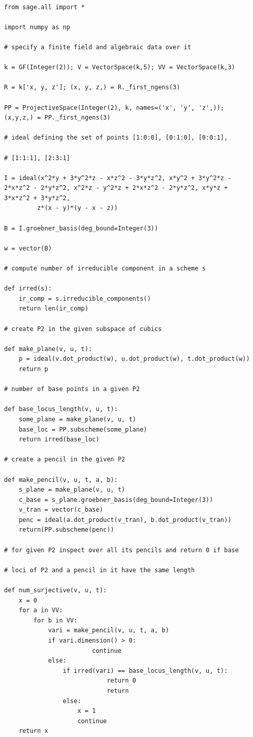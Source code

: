 \documentclass[14pt]{amsart}
\theoremstyle{definition}
\theoremstyle{remark}
\begin{document}
{\small
\begin{lstlisting}

from sage.all import *

import numpy as np

# specify a finite field and algebraic data over it

k = GF(Integer(2)); V = VectorSpace(k,5); VV = VectorSpace(k,3)

R = k['x, y, z']; (x, y, z,) = R._first_ngens(3)

PP = ProjectiveSpace(Integer(2), k, names=('x', 'y', 'z',));
(x,y,z,) = PP._first_ngens(3)

# ideal defining the set of points [1:0:0], [0:1:0], [0:0:1],

# [1:1:1], [2:3:1]

I = ideal(x^2*y + 3*y^2*z - x*z^2 - 3*y*z^2, x*y^2 + 3*y^2*z -
2*x*z^2 - 2*y*z^2, x^2*z - y^2*z + 2*x*z^2 - 2*y*z^2, x*y*z +
3*x*z^2 + 3*y*z^2,
         z*(x - y)*(y - x - z))

B = I.groebner_basis(deg_bound=Integer(3))

w = vector(B)

# compute number of irreducible component in a scheme s

def irred(s):
    ir_comp = s.irreducible_components()
    return len(ir_comp)

# create P2 in the given subspace of cubics

def make_plane(v, u, t):
    p = ideal(v.dot_product(w), u.dot_product(w), t.dot_product(w))
    return p

# number of base points in a given P2

def base_locus_length(v, u, t):
    some_plane = make_plane(v, u, t)
    base_loc = PP.subscheme(some_plane)
    return irred(base_loc)

# create a pencil in the given P2

def make_pencil(v, u, t, a, b):
    s_plane = make_plane(v, u, t)
    c_base = s_plane.groebner_basis(deg_bound=Integer(3))
    v_tran = vector(c_base)
    penc = ideal(a.dot_product(v_tran), b.dot_product(v_tran))
    return(PP.subscheme(penc))

# for given P2 inspect over all its pencils and return 0 if base

# loci of P2 and a pencil in it have the same length

def num_surjective(v, u, t):
    x = 0
    for a in VV:
        for b in VV:
            vari = make_pencil(v, u, t, a, b)
            if vari.dimension() > 0:
                        continue
            else:
                if irred(vari) == base_locus_length(v, u, t):
                            return 0
                            return
                else:
                    x = 1
                    continue
    return x


\end{lstlisting}}
\end{document}
